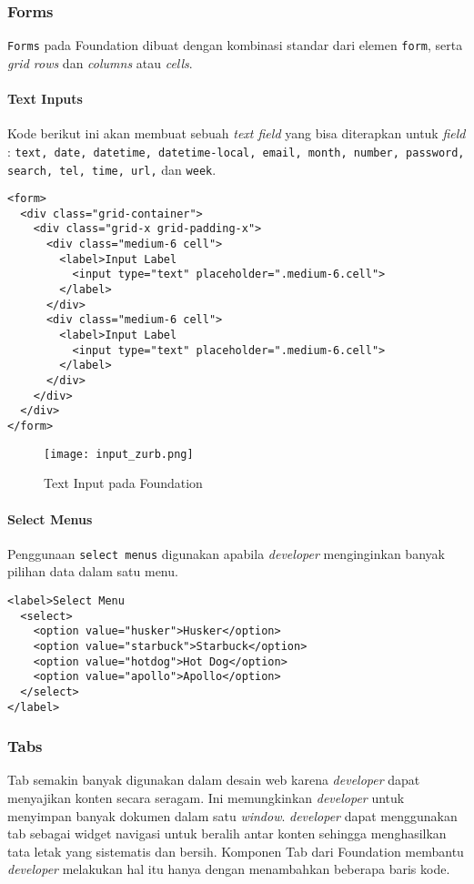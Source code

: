 {\subsubsection{Forms}
\texttt{Forms} pada Foundation dibuat dengan kombinasi standar dari elemen \texttt{form}, serta \textit{grid rows} dan \textit{columns} atau \textit{cells}. 

\paragraph{Text Inputs}
Kode berikut ini akan membuat sebuah \textit{text field} yang bisa diterapkan untuk \textit{field} : \texttt{text, date, datetime, datetime-local, email, month, number, password, search, tel, time, url,} dan \texttt{week}.

\begin{lstlisting}[frame=single] 
<form>
  <div class="grid-container">
    <div class="grid-x grid-padding-x">
      <div class="medium-6 cell">
        <label>Input Label
          <input type="text" placeholder=".medium-6.cell">
        </label>
      </div>
      <div class="medium-6 cell">
        <label>Input Label
          <input type="text" placeholder=".medium-6.cell">
        </label>
      </div>
    </div>
  </div>
</form>
\end{lstlisting}

\begin{figure} [H]
	\centering  
	\texttt{[image: input\_zurb.png]}  
	\caption{Text Input pada Foundation}
	\label{fig:gridbasic_zurb} 
\end{figure}

\paragraph{Select Menus}
Penggunaan \texttt{select menus} digunakan apabila \textit{developer} menginginkan banyak pilihan data dalam satu menu.
\begin{lstlisting}[frame=single] 
<label>Select Menu
  <select>
    <option value="husker">Husker</option>
    <option value="starbuck">Starbuck</option>
    <option value="hotdog">Hot Dog</option>
    <option value="apollo">Apollo</option>
  </select>
</label>
\end{lstlisting}


\subsubsection{Tabs}
Tab semakin banyak digunakan dalam desain web karena \textit{developer} dapat menyajikan konten secara seragam. Ini memungkinkan \textit{developer} untuk menyimpan banyak dokumen dalam satu \textit{window}. \textit{developer} dapat menggunakan tab sebagai widget navigasi untuk beralih antar konten sehingga menghasilkan tata letak yang sistematis dan bersih. Komponen Tab dari Foundation membantu \textit{developer} melakukan hal itu hanya dengan menambahkan beberapa baris kode. 

}
